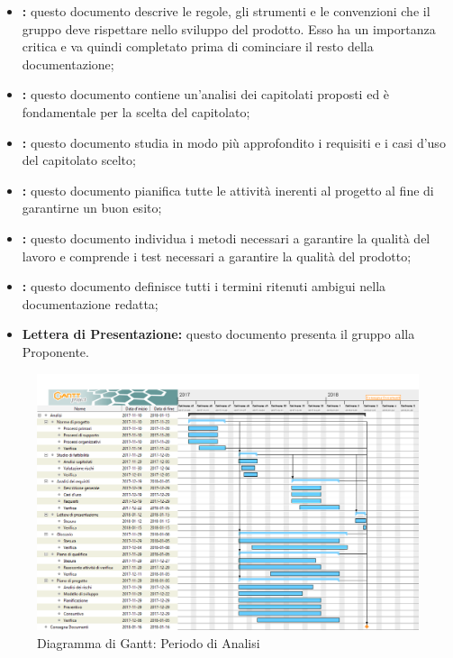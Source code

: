             \begin{itemize}
                \item \textbf{\NormeProgetto{}:}
                    questo documento descrive le regole, gli strumenti e le convenzioni
                    che il gruppo \GroupName{} deve rispettare nello sviluppo del
                    prodotto. Esso ha un importanza critica e
                    va quindi completato prima di cominciare il resto della documentazione;
                \item \textbf{\StudioFattibilita{}:}
                    questo documento contiene un'analisi dei capitolati proposti ed è
                    fondamentale per la scelta del capitolato;
                \item \textbf{\AnalisiRequisiti{}:}
                    questo documento studia in modo più approfondito i requisiti e i casi d'uso
                    del capitolato scelto;
                \item \textbf{\PianoProgetto{}:}
                    questo documento pianifica tutte le attività inerenti al progetto al fine di
                    garantirne un buon esito;
                \item \textbf{\PianoQualifica{}:}
                    questo documento individua i metodi necessari a garantire la qualità del lavoro e comprende i test
                    necessari a garantire la qualità del prodotto;
                \item \textbf{\Glossario{}:}
                    questo documento definisce tutti i termini ritenuti ambigui nella documentazione redatta;
                \item \textbf{Lettera di Presentazione:}
                    questo documento presenta il gruppo \GroupName{} alla Proponente.
            \end{itemize}
	
            \begin{figure}[H]
                \centering
                \includegraphics[width=1\linewidth]{./img/Gantt/Analisi.png}
                \caption[Gantt - Analisi]{Diagramma di Gantt: Periodo di Analisi}
            \end{figure}
	
